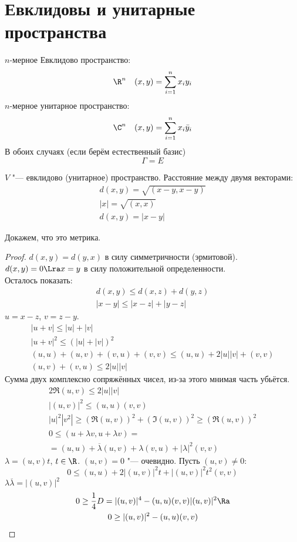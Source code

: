 \section{Евклидовы и унитарные пространства}

\begin{Def}
	$n$-мерное Евклидово пространство:
	\[ \R^n \quad (x, y) = \sum_{i=1}^n x_iy_i \]
	$n$-мерное унитарное пространство:
	\[ \C^n \quad (x, y) = \sum_{i=1}^n x_i \bar y_i \]
	В обоих случаях (если берём естественный базис)
	\[ \Gamma = E \]
\end{Def}

\begin{Def}
	$V$ "--- евклидово (унитарное) пространство.
	Расстояние между двумя векторами:
	\begin{gather*}
		d(x, y) = \sqrt{(x - y, x - y)} \\
		|x| = \sqrt{(x, x)} \\
		d(x, y) = |x - y|
	\end{gather*}
\end{Def}

Докажем, что это метрика.
\begin{proof}
	$d(x, y) = d(y, x)$ в силу симметричности (эрмитовой). \\
	$d(x, y) = 0 \Lra x = y$ в силу положительной определенности. \\
	Осталось показать:
	\begin{gather*}
		d(x, y) \le d(x, z) + d(y, z) \\
		|x - y| \le |x - z| + |y - z|
	\end{gather*}
	$u = x - z$, $v = z - y$.
	\begin{gather*}
		|u + v| \le |u| + |v| \\
		|u + v|^2 \le (|u| + |v|)^2 \\
		(u, u) + (u, v) + (v, u) + (v, v) \le (u, u) + 2|u||v| + (v, v) \\
		(u, v) + (v, u) \le 2|u||v|
	\end{gather*}
	Сумма двух комплексно сопряжённых чисел, из-за этого мнимая часть убьётся.
	\begin{gather*}
		2\Re(u, v) \le 2|u||v| \\
		|(u, v)|^2 \le (u, u)(v, v) \\
		|u|^2 |v^2| \ge (\Re(u, v))^2 + (\Im(u, v))^2 \ge (\Re(u,v))^2 \\
		0 \le (u + \lambda v, u + \lambda v) =  \\
		= (u, u) + \overline{\lambda}(u, v) + \lambda(v, u) + |\lambda|^2(v, v)
	\end{gather*}
	$\lambda = (u, v)t$, $t \in \R$.
	$(u, v) = 0$ "--- очевидно.
	Пусть $(u, v) \ne 0$:
	\[
		0 \le (u, u) + 2|(u, v)|^2t + |(u, v)|^2t^2(v, v)
	\]
	$\lambda\overline{\lambda} = |(u, v)|^2$
	\begin{gather*}
		0 \ge \frac{1}{4}D = |(u,v)|^4 - (u, u)(v, v)|(u, v)|^2 \Ra \\
		0 \ge |(u, v)|^2 - (u, u)(v, v)
	\end{gather*}
\end{proof}

